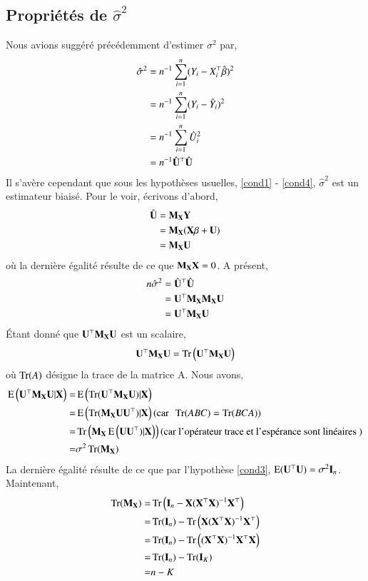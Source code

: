 \documentclass[10pt, reqno]{amsart}
\begin{document}
\subsection{Propriétés de $\hat{\sigma}^2$}
Nous avions suggéré précédemment d'estimer $\sigma^2$ par,
\begin{align*}
\hat{\sigma}^2 &= n^{-1}\sum_{i=1}^n (Y_i-X_i^\top\hat{\beta})^2\\
&= n^{-1}\sum_{i=1}^n (Y_i-\hat{Y}_i)^2\\
&= n^{-1}\sum_{i=1}^n \hat{U}_i^2\\
& =  n^{-1}\hat{\mathbf U}^\top\hat{\mathbf U}
\end{align*}
Il s'avère cependant que sous les hypothèses usuelles, \eqref{cond1} - \eqref{cond4}, $\hat{\sigma}^2$ est un estimateur biaisé. Pour le voir, écrivons d'abord,
\begin{align*}
\hat{\mathbf U} &= \mathbf M_\mathbf X\mathbf Y\\
& = \mathbf M_\mathbf X(\mathbf X\beta + \mathbf U)\\
& = \mathbf M_\mathbf X\mathbf U
\end{align*}
où la dernière égalité résulte de ce que $\mathbf M_\mathbf X\mathbf X = 0$. A présent,
\begin{align*}
n\hat{\sigma}^2 &= \hat{\mathbf U}^\top\hat{\mathbf U}\\
& = \mathbf U^\top\mathbf M_\mathbf X\mathbf M_\mathbf X\mathbf U \\
&= \mathbf U^\top\mathbf M_\mathbf X\mathbf U
\end{align*}
\'Etant donné que $\mathbf U^\top\mathbf M_\mathbf X\mathbf U$ est un scalaire,
\begin{align*}
\mathbf U^\top\mathbf M_\mathbf X\mathbf U = \operatorname{Tr}\left(\mathbf U^\top\mathbf M_\mathbf X\mathbf U\right)
\end{align*}
où $\operatorname{Tr}(A)$ désigne la trace de la matrice A. Nous avons,
\begin{align*}
\operatorname{E}\left(\mathbf U^\top\mathbf M_\mathbf X\mathbf U|\mathbf X\right) =&  \operatorname{E}\left(\operatorname{Tr}(\mathbf U^\top\mathbf M_\mathbf X\mathbf U)|\mathbf X\right)\\
=&\operatorname{E}\left(\operatorname{Tr}(\mathbf M_\mathbf X\mathbf U\mathbf U^\top)|\mathbf X\right)(\textrm{car \ } \operatorname{Tr}(ABC) = \operatorname{Tr}(BCA))\\
=&\operatorname{Tr}\left(\mathbf M_\mathbf X\operatorname{E}\left(\mathbf U\mathbf U^\top)|\mathbf X\right)\right)(\textrm{car l'opérateur trace et l'espérance sont linéaires })\\
=&\sigma^2\operatorname{Tr}(\mathbf M_\mathbf X)
\end{align*}
La dernière égalité résulte de ce que par l'hypothèse \eqref{cond3}, $\operatorname{E}(\mathbf U^\top\mathbf U) = \sigma^2\mathbf{I}_n$. Maintenant,
\begin{align*}
\operatorname{Tr}(\mathbf M_\mathbf X) = &\operatorname{Tr}\left(\mathbf{I}_n - \mathbf X(\mathbf X^\top\mathbf X)^{-1}\mathbf X^\top\right)\\
=&\operatorname{Tr}(\mathbf{I}_n) - \operatorname{Tr}\left(
\mathbf X(\mathbf X^\top\mathbf X)^{-1}\mathbf X^\top\right)\\
=&\operatorname{Tr}(\mathbf{I}_n) - \operatorname{Tr}\left((\mathbf X^\top\mathbf X)^{-1}\mathbf X^\top\mathbf X\right)\\
=&\operatorname{Tr}(\mathbf{I}_n) - \operatorname{Tr}(\mathbf{I}_K)\\
=&n-K
\end{align*}
\end{document}
